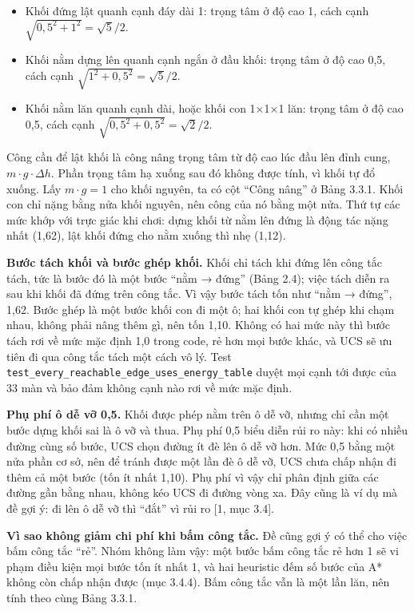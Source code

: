 \begin{itemize}
\tightlist
\item
  Khối đứng lật quanh cạnh đáy dài 1: trọng tâm ở độ cao 1, cách cạnh \(\sqrt{0{,}5^2 + 1^2} = \sqrt{5}/2\).
\item
  Khối nằm dựng lên quanh cạnh ngắn ở đầu khối: trọng tâm ở độ cao 0,5, cách cạnh \(\sqrt{1^2 + 0{,}5^2} = \sqrt{5}/2\).
\item
  Khối nằm lăn quanh cạnh dài, hoặc khối con 1×1×1 lăn: trọng tâm ở độ cao 0,5, cách cạnh \(\sqrt{0{,}5^2 + 0{,}5^2} = \sqrt{2}/2\).
\end{itemize}

Công cần để lật khối là công nâng trọng tâm từ độ cao lúc đầu lên đỉnh cung, \(m \cdot g \cdot \Delta h\). Phần trọng tâm hạ xuống sau đó không được tính, vì khối tự đổ xuống. Lấy \(m \cdot g = 1\) cho khối nguyên, ta có cột ``Công nâng'' ở Bảng 3.3.1. Khối con chỉ nặng bằng nửa khối nguyên, nên công của nó bằng một nửa. Thứ tự các mức khớp với trực giác khi chơi: dựng khối từ nằm lên đứng là động tác nặng nhất (1,62), lật khối đứng cho nằm xuống thì nhẹ (1,12).

\textbf{Bước tách khối và bước ghép khối.} Khối chỉ tách khi đứng lên công tắc tách, tức là bước đó là một bước ``nằm → đứng'' (Bảng 2.4); việc tách diễn ra sau khi khối đã đứng trên công tắc. Vì vậy bước tách tốn như ``nằm → đứng'', 1,62. Bước ghép là một bước khối con đi một ô; hai khối con tự ghép khi chạm nhau, không phải nâng thêm gì, nên tốn 1,10. Không có hai mức này thì bước tách rơi về mức mặc định 1,0 trong code, rẻ hơn mọi bước khác, và UCS sẽ ưu tiên đi qua công tắc tách một cách vô lý. Test \texttt{test\_\allowbreak{}every\_\allowbreak{}reachable\_\allowbreak{}edge\_\allowbreak{}uses\_\allowbreak{}energy\_\allowbreak{}table} duyệt mọi cạnh tới được của 33 màn và bảo đảm không cạnh nào rơi về mức mặc định.

\textbf{Phụ phí ô dễ vỡ 0,5.} Khối được phép nằm trên ô dễ vỡ, nhưng chỉ cần một bước dựng khối sai là ô vỡ và thua. Phụ phí 0,5 biểu diễn rủi ro này: khi có nhiều đường cùng số bước, UCS chọn đường ít đè lên ô dễ vỡ hơn. Mức 0,5 bằng một nửa phần cơ sở, nên để tránh được một lần đè ô dễ vỡ, UCS chưa chấp nhận đi thêm cả một bước (tốn ít nhất 1,10). Phụ phí vì vậy chỉ phân định giữa các đường gần bằng nhau, không kéo UCS đi đường vòng xa. Đây cũng là ví dụ mà đề gợi ý: đi lên ô dễ vỡ thì ``đắt'' vì rủi ro {[}1, mục 3.4{]}.

\textbf{Vì sao không giảm chi phí khi bấm công tắc.} Đề cũng gợi ý có thể cho việc bấm công tắc ``rẻ''. Nhóm không làm vậy: một bước bấm công tắc rẻ hơn 1 sẽ vi phạm điều kiện mọi bước tốn ít nhất 1, và hai heuristic đếm số bước của A* không còn chấp nhận được (mục 3.4.4). Bấm công tắc vẫn là một lần lăn, nên tính theo cùng Bảng 3.3.1.

